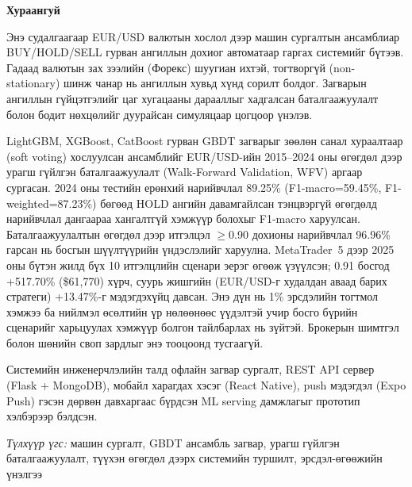 
\vspace{10mm}

\begin{center}
\textbf{\large Хураангуй}
\end{center}

\sloppy

Энэ судалгаагаар EUR/USD валютын хослол дээр машин сургалтын ансамблиар BUY/HOLD/SELL гурван ангиллын дохиог автоматаар гаргах системийг бүтээв. Гадаад валютын зах зээлийн (Форекс) шуугиан ихтэй, тогтворгүй (non-stationary) шинж чанар нь ангиллын хувьд хүнд сорилт болдог. Загварын ангиллын гүйцэтгэлийг цаг хугацааны дарааллыг хадгалсан баталгаажуулалт болон бодит нөхцөлийг дуурайсан симуляцаар цогцоор үнэлэв.

LightGBM, XGBoost, CatBoost гурван GBDT загварыг зөөлөн санал хураалтаар (soft voting) хослуулсан ансамблийг EUR/USD-ийн 2015--2024 оны өгөгдөл дээр урагш гүйлгэн баталгаажуулалт (Walk-Forward Validation, WFV) аргаар сургасан. 2024 оны тестийн ерөнхий нарийвчлал 89.25\% (F1-macro=59.45\%, F1-weighted=87.23\%) бөгөөд HOLD ангийн давамгайлсан тэнцвэргүй өгөгдөлд нарийвчлал дангаараа хангалтгүй хэмжүүр болохыг F1-macro харуулсан. Баталгаажуулалтын өгөгдөл дээр итгэлцэл $\geq$0.90 дохионы нарийвчлал 96.96\% гарсан нь босгын шүүлтүүрийн үндэслэлийг харуулна. MetaTrader~5 дээр 2025 оны бүтэн жилд бүх 10 итгэлцлийн сценари эерэг өгөөж үзүүлсэн; 0.91 босгод +517.70\% (\$61{,}770) хүрч, суурь жишгийн (EUR/USD-г худалдан аваад барих стратеги) +13.47\%-г мэдэгдэхүйц давсан. Энэ дүн нь 1\% эрсдэлийн тогтмол хэмжээ ба нийлмэл өсөлтийн үр нөлөөнөөс үүдэлтэй учир босго бүрийн сценарийг харьцуулах хэмжүүр болгон тайлбарлах нь зүйтэй. Брокерын шимтгэл болон шөнийн своп зардлыг энэ тооцоонд тусгаагүй.

Системийн инженерчлэлийн талд офлайн загвар сургалт, REST API сервер (Flask + MongoDB), мобайл харагдах хэсэг (React Native), push мэдэгдэл (Expo Push) гэсэн дөрвөн давхаргаас бүрдсэн ML serving дамжлагыг прототип хэлбэрээр бэлдсэн.

\vspace{3mm}
\textit{Түлхүүр үгс:} машин сургалт, GBDT ансамбль загвар, урагш гүйлгэн баталгаажуулалт, түүхэн өгөгдөл дээрх системийн туршилт, эрсдэл-өгөөжийн үнэлгээ
